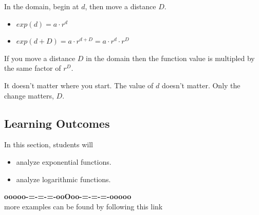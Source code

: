 \documentclass{ximera}
\begin{document}
\begin{procedure}

In the domain, begin at $d$, then move a distance $D$. 

\begin{itemize}
\item $exp(d) = a \cdot r^d$
\item $exp(d+D) = a \cdot r^{d+D} = a \cdot r^d \cdot r^D$
\end{itemize}


If you move a distance $D$ in the domain then the function value is multipled by the same factor of $r^D$.

It doesn't matter where you start.  The value of $d$ doesn't matter. Only the change matters, $D$.






\end{procedure}


\subsection*{Learning Outcomes}



\begin{sectionOutcomes}
In this section, students will 

\begin{itemize}
\item analyze exponential functions.
\item analyze logarithmic functions.
\end{itemize}
\end{sectionOutcomes}















\begin{center}
\textbf{\textcolor{green!50!black}{ooooo-=-=-=-ooOoo-=-=-=-ooooo}} \\

more examples can be found by following this link\\ 

\end{center}
\end{document}
